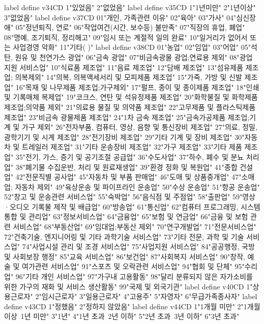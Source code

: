         label define v34CD 1"있었음" 2"없었음"
        label define v35CD 1"1년미만" 2"1년이상" 3"없었음"
        label define v37CD 01"개인, 가족관련 이유" 02"육아" 03"가사" 04"심신장애" 05"정년퇴직, 연로" 06"작업여건(시간, 보수등) 불만족" 07"직장의 휴업, 폐업" 08"명예, 조기퇴직, 정리해고" 09"임시 또는 계절적 일의 완료" 10"일거리가 없어서 또는 사업경영 악화" 11"기타(  )"
        label define v38CD 01"농업" 02"임업" 03"어업" 05"석탄, 원유 및 천연가스 광업" 06"금속 광업" 07"비금속광물 광업;연료용 제외" 08"광업 지원 서비스업" 10"식료품 제조업" 11"음료 제조업" 12"담배 제조업" 13"섬유제품 제조업; 의복제외" 14"의복, 의복액세서리 및 모피제품 제조업" 15"가죽, 가방 및 신발 제조업" 16"목재 및 나무제품 제조업;가구제외" 17"펄프, 종이 및 종이제품 제조업" 18"인쇄 및 기록매체 복제업" 19"코크스, 연탄 및 석유정제품 제조업" 20"화학물질 및 화학제품 제조업;의약품 제외" 21"의료용 물질 및 의약품 제조업" 22"고무제품 및 플라스틱제품 제조업" 23"비금속 광물제품 제조업" 24"1차 금속 제조업" 25"금속가공제품 제조업;기계 및 가구 제외" 26"전자부품, 컴퓨터, 영상, 음향 및 통신장비 제조업" 27"의료, 정밀, 광학기기 및 시계 제조업" 28"전기장비 제조업" 29"기타 기계 및 장비 제조업" 30"자동차 및 트레일러 제조업" 31"기타 운송장비 제조업" 32"가구 제조업" 33"기타 제품 제조업" 35"전기, 가스, 증기 및 공기조절 공급업" 36"수도사업" 37"하수, 폐수 및 분뇨 처리업" 38"폐기물 수집운반, 처리 및 원료재생업" 39"환경 정화 및 복원업" 41"종합 건설업" 42"전문직별 공사업" 45"자동차 및 부품 판매업" 46"도매 및 상품중개업" 47"소매업; 자동차 제외" 49"육상운송 및 파이프라인 운송업" 50"수상 운송업" 51"항공 운송업" 52"창고 및 운송관련 서비스업" 55"숙박업" 56"음식점 및 주점업" 58"출판업" 59"영상·오디오 기록물 제작 및 배급업" 60"방송업" 61"통신업" 62"컴퓨터 프로그래밍, 시스템 통합 및 관리업" 63"정보서비스업" 64"금융업" 65"보험 및 연금업" 66"금융 및 보험 관련 서비스업" 68"부동산업" 69"임대업;부동산 제외" 70"연구개발업" 71"전문서비스업" 72"건축기술, 엔지니어링 및 기타 과학기술 서비스업" 73"기타 전문, 과학 및 기술 서비스업" 74"사업시설 관리 및 조경 서비스업" 75"사업지원 서비스업" 84"공공행정, 국방 및 사회보장 행정" 85"교육 서비스업" 86"보건업" 87"사회복지 서비스업" 90"창작, 예술 및 여가관련 서비스업" 91"스포츠 및 오락관련 서비스업" 94"협회 및 단체" 95"수리업" 96"기타 개인 서비스업" 97"가구내 고용활동" 98"달리 분류되지 않은 자가소비를 위한 가구의 재화 및 서비스 생산활동" 99"국제 및 외국기관"
        label define v40CD 1"상용근로자" 2"임시근로자" 3"일용근로자" 4"고용주" 5"자영자" 6"무급가족종사자"
        label define v43CD 1"정했음" 2"정하지 않았음"
        label define v44CD 1"1개월 미만" 2"1개월 이상~1년 미만" 3"1년" 4"1년 초과~2년 이하" 5"2년 초과~3년 이하" 6"3년 초과"

